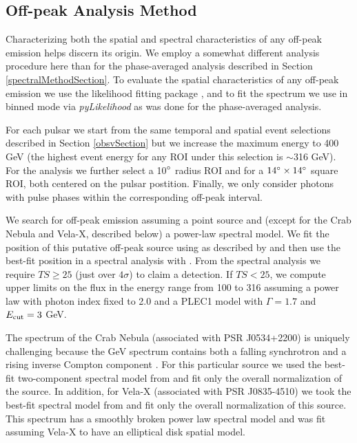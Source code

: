 \subsection{Off-peak Analysis Method}
\label{off_peak_analysis}

Characterizing both the spatial and spectral
characteristics of any off-peak emission helps discern its origin.
We employ a somewhat different analysis procedure here than
for the phase-averaged analysis described in Section
\ref{spectralMethodSection}.  To evaluate the spatial characteristics of
any off-peak emission we use the likelihood fitting package \pointlike
\citep[detailed in][]{LAT_collaboration_extended_search_2012}, and
to fit the spectrum we use \gtlike in binned mode via {\it pyLikelihood} as was done for the
phase-averaged analysis.

For each pulsar we start from
the same temporal and spatial event selections described in Section
\ref{obsvSection} but we increase the maximum energy to 400 GeV (the
highest event energy for any ROI under this selection is $\sim$316 GeV).
For the \pointlike analysis we further select a 10$^\circ$ radius ROI
and for \gtlike a $14^\circ\times14^\circ$ square ROI, both centered
on the pulsar postition.  Finally, we only consider photons with 
pulse phases within the corresponding off-peak interval.

We search for off-peak emission
assuming a point source and (except for the Crab Nebula and Vela-X, described below) 
a power-law spectral model.  We fit the position of this
putative off-peak source using \pointlike as described by \citet{2FGL}
and then use the best-fit position in a spectral analysis with \gtlike.
From the spectral analysis we require $TS\geq25$ (just over $4\sigma$)
to claim a detection.  If $TS<25$, we compute upper limits on the flux 
in the energy range from 100 \mev to 316 \gev
assuming
a power law with photon index fixed to 2.0 and a PLEC1 model with
$\Gamma=1.7$ and $E_{\rm cut}=3$ GeV.

The spectrum of the Crab Nebula (associated with PSR J0534+2200) is
uniquely challenging because the GeV spectrum contains both a falling
synchrotron and a rising inverse Compton component \citep{FermiCrab}.
For this particular source we used the best-fit two-component spectral
model from \cite{LAT_collaboration_crab_2012} and fit only the overall
normalization of the source. 
In addition, for Vela-X (associated with PSR J0835-4510) we took the
best-fit spectral model from \cite{FermiVelaX2nd} and fit only the overall
normalization of this source. This spectrum has a smoothly broken power
law spectral model and was fit assuming Vela-X to have an elliptical
disk spatial model.

